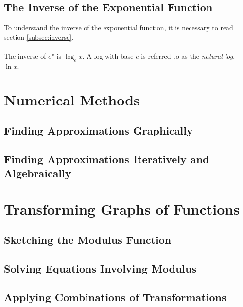 \documentclass{article}
\begin{document}
	\subsection{The Inverse of the Exponential Function}
	To understand the inverse of the exponential function, it is necessary to read section \ref{subsec:inverse}.
	\\\\
	The inverse of $e^x$ is $\log_ex$. A log with base $e$ is referred to as the \textit{natural log}, $\ln x$. 
	
	\begin{center}
	\end{center}
	\section{Numerical Methods}
	\subsection{Finding Approximations Graphically }
	\subsection{Finding Approximations Iteratively and Algebraically}
	\section{Transforming Graphs of Functions}
	\subsection{Sketching the Modulus Function}
	\subsection{Solving Equations Involving Modulus}
	\subsection{Applying Combinations of Transformations}
\end{document}
